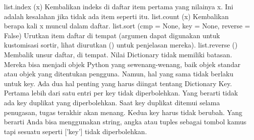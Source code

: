 list.index (x) 
Kembalikan indeks di daftar item pertama yang nilainya x. Ini adalah kesalahan jika tidak ada item seperti itu. 
list.count (x) 
Kembalikan berapa kali x muncul dalam daftar. 
list.sort (cmp = None, key = None, reverse = False) 
Urutkan item daftar di tempat (argumen dapat digunakan untuk kustomisasi sortir, lihat diurutkan () untuk penjelasan mereka). 
list.reverse () 
Membalik unsur daftar, di tempat. 
Nilai Dictionary tidak memiliki batasan. Mereka bisa menjadi objek Python yang sewenang-wenang, baik objek standar atau objek yang ditentukan pengguna. Namun, hal yang sama tidak berlaku untuk key. 
Ada dua hal penting yang harus diingat tentang Dictionary Key. 
Pertama lebih dari satu entri per key tidak diperbolehkan. Yang berarti tidak ada key duplikat yang diperbolehkan. Saat key duplikat ditemui selama penugasan, tugas terakhir akan menang. 
Kedua key harus tidak berubah. Yang berarti Anda bisa menggunakan string, angka atau tuples sebagai tombol kamus tapi sesuatu seperti ['key'] tidak diperbolehkan. 
